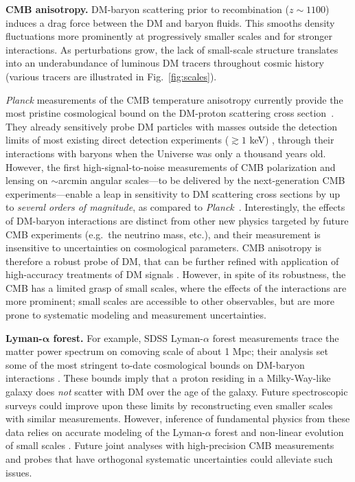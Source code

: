 \documentclass[12pt]{article}
\begin{document}
\textbf{CMB anisotropy.} 
DM-baryon scattering prior to recombination ($z\sim 1100$) induces a drag force between the DM and baryon fluids. 
This smooths density fluctuations more prominently at progressively smaller scales and for stronger interactions.
As perturbations grow, the lack of small-scale structure translates into an underabundance of luminous DM tracers throughout cosmic history (various tracers are illustrated in Fig.~\ref{fig:scales}).

\textit{Planck} measurements of the CMB temperature anisotropy currently provide the most pristine cosmological bound on the DM-proton scattering cross section~\cite{Boddy:2018kfv,Gluscevic:2017ywp,Boddy:2018wzy,Xu:2018efh,Slatyer:2018aqg,Dvorkin:2013cea}.
They already sensitively probe DM particles with masses outside the detection limits of most existing direct detection experiments ($\gtrsim 1$ keV) \cite{Gluscevic:2017ywp}, through their interactions with baryons when the Universe was only a thousand years old.
However, the first high-signal-to-noise measurements of CMB polarization and lensing on $\sim$arcmin angular scales---to be delivered by the next-generation CMB experiments---enable a leap in sensitivity to DM scattering cross sections by up to \textit{several orders of magnitude}, as compared to \textit{Planck}~\cite{2018PhRvD..98l3524L,2019JCAP...02..056A,Abazajian:2016yjj,2019arXiv190210541H}.
Interestingly, the effects of DM-baryon interactions are distinct from other new physics targeted by future CMB experiments (e.g.~the neutrino mass, etc.), and their measurement is insensitive to uncertainties on cosmological parameters.
CMB anisotropy is therefore a robust probe of DM, that can be further refined with application of high-accuracy treatments of DM signals \cite{AliHaimoud_19}.
However, in spite of its robustness, the CMB has a limited grasp of small scales, where the effects of the interactions are more prominent; small scales are accessible to other observables, but are more prone to systematic modeling and measurement uncertainties.

\textbf{Lyman-${\boldsymbol\alpha}$ forest.} 
For example, SDSS Lyman-$\alpha$ forest measurements trace the matter power spectrum on comoving scale of about 1 Mpc; their analysis set some of the most stringent to-date cosmological bounds on DM-baryon interactions \cite{Xu:2018efh,Dvorkin:2013cga}.
These bounds imply that a proton residing in a Milky-Way-like galaxy does \textit{not} scatter with DM over the age of the galaxy.
Future spectroscopic surveys could improve upon these limits by reconstructing even smaller scales with similar measurements.
However, inference of fundamental physics from these data relies on accurate modeling of the Lyman-$\alpha$ forest and non-linear evolution of small scales \cite{2017PhRvD..96b3522I}.
Future joint analyses with high-precision CMB measurements and probes that have orthogonal systematic uncertainties could alleviate such issues.
\end{document}
